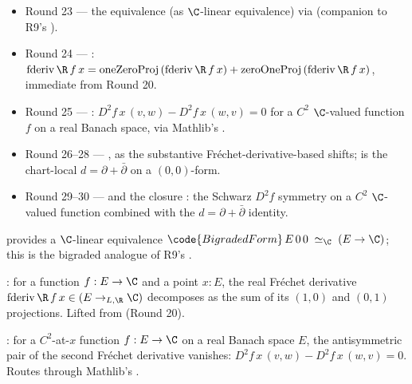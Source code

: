 \begin{itemize}
\item Round 23 --- the equivalence
   (as $\C$-linear equivalence)
  via  (companion
  to R9's ).
\item Round 24 --- : \(\mathrm{fderiv}\,\R\,f\,x
  = \mathrm{oneZeroProj}\,(\mathrm{fderiv}\,\R\,f\,x)
    + \mathrm{zeroOneProj}\,(\mathrm{fderiv}\,\R\,f\,x)\),
  immediate from Round 20.
\item Round 25 --- :
  \(D^{2}f\,x\,(v, w) - D^{2}f\,x\,(w, v) = 0\) for a \(C^{2}\)
  \(\C\)-valued function \(f\) on a real Banach space, via
  Mathlib's .
\item Round 26--28 --- ,
   as the substantive
  Fr\'echet-derivative-based shifts; 
  is the chart-local \(d = \partial + \bar\partial\) on a
  \((0,0)\)-form.
\item Round 29--30 ---  and the
  closure : the
  Schwarz \(D^{2}f\) symmetry on a \(C^{2}\) \(\C\)-valued
  function combined with the \(d = \partial + \bar\partial\)
  identity.
\end{itemize}

\begin{lemma}
\label{lem:r7subA-r23}
 provides a \(\C\)-linear equivalence
$\code{BigradedForm}\,E\,0\,0 \;\simeq_{\C}\; (E \to \C)$;
this is the bigraded analogue of R9's .
\leanok
\end{lemma}

\begin{lemma}
\label{lem:r7subA-r24}
: for a function \(f : E \to \C\) and
a point \(x : E\), the real Fr\'echet derivative
\(\mathrm{fderiv}\,\R\,f\,x \in (E \to_{L,\R} \C)\) decomposes as
the sum of its \((1,0)\) and \((0,1)\) projections.  Lifted from
 (Round 20).
\leanok
\end{lemma}

\begin{lemma}
\label{lem:r7subA-r25}
: for a \(C^{2}\)-at-\(x\) function
\(f : E \to \C\) on a real Banach space \(E\), the antisymmetric
pair of the second Fr\'echet derivative vanishes:
\(D^{2}f\,x\,(v, w) - D^{2}f\,x\,(w, v) = 0\).  Routes through
Mathlib's .
\leanok
\end{lemma}


